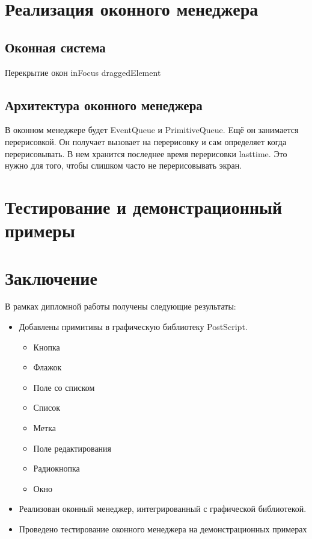 \documentclass[14pt]{extarticle}
\begin{document}
	\section{Реализация оконного менеджера}
	\subsection{ Оконная система }
	Перекрытие окон
	inFocus
	draggedElement
	\subsection{ Архитектура оконного менеджера}
	В оконном менеджере будет EventQueue и PrimitiveQueue.
	Eщё он занимается перерисовкой. Он получает вызовает на перерисовку и сам определяет когда перерисовывать. В нем хранится последнее время перерисовки lasttime. Это нужно для того, чтобы слишком часто не перерисовывать экран.
	\pagebreak
	\section{Тестирование и демонстрационный примеры}

	\pagebreak
	
	\section*{Заключение}
	
	В рамках дипломной работы получены следующие результаты:
	\begin{itemize}
		\item Добавлены примитивы в графическую библиотеку  PostScript.
		\begin{itemize}
			\item Кнопка
			\item Флажок
			\item Поле со списком
			\item Список
			\item Метка
			\item Поле редактирования
			\item Радиокнопка
			\item Окно
		\end{itemize}
		\item Реализован оконный менеджер, интегрированный с графической библиотекой.
		\item Проведено тестирование оконного менеджера на демонстрационных примерах
	\end{itemize}
	
\end{document}
